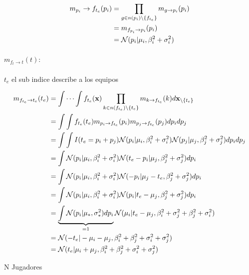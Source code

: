 \documentclass[11pt,twoside,spanish]{report} %
\begin{document}
\begin{equation}
	\centering
	\begin{split}
		m_{p_i}\rightarrow f_{t_e}(p_i) & = \prod_{g\in n(p_i)\backslash\{f_{t_e}\}} m_{g\rightarrow p_i}(p_i) \\
		& = m_{f_{p_i}\rightarrow p_i}(p_i) \\
		& =  \mathcal{N}(p_i \vert \mu_i,\beta_i^2+\sigma_i^2)
	\end{split}
\end{equation}

\paragraph{$m_{f_{t}\rightarrow t}(t):$} $t_e$ el sub indice describe a los equipos

\begin{equation}
	\centering
	\begin{split}
		m_{f_{t_e}\rightarrow t_e}(t_e) & = \int\cdots\int f_{t_e}(\textbf{x})\prod_{k\in n(f_{t_e})\backslash\{t_e\}} m_{k\rightarrow f_{t_e}}(k)d\textbf{x}_{\backslash \{t_e\}} \\
		& = \int\int f_{t_e}(t_e) m_{p_i\rightarrow f_{t_e}}(p_i)m_{p_j\rightarrow f_{t_e}}(p_j)dp_idp_j \\
		& = \int\int I(t_e=p_i+p_j)\mathcal{N}(p_i \vert \mu_i,\beta_i^2+\sigma_i^2)\mathcal{N}(p_j \vert \mu_j,\beta_j^2+\sigma_j^2)dp_idp_j\\
		& = \int \mathcal{N}(p_i \vert \mu_i,\beta_i^2+\sigma_i^2)\mathcal{N}(t_e-p_i \vert \mu_j,\beta_j^2+\sigma_j^2)dp_i\\
		& = \int \mathcal{N}(p_i \vert \mu_i,\beta_i^2+\sigma_i^2)\mathcal{N}(-p_i \vert \mu_j-t_e,\beta_j^2+\sigma_j^2)dp_i\\
		& = \int \mathcal{N}(p_i \vert \mu_i,\beta_i^2+\sigma_i^2)\mathcal{N}(p_i \vert t_e-\mu_j,\beta_j^2+\sigma_j^2)dp_i\\
		& = \underbrace{\int \mathcal{N}(p_i \vert \mu_{\ast},\sigma_{\ast}^2)dp_i}_{=1}\mathcal{N}(\mu_i \vert t_e-\mu_j,\beta_i^2+\sigma_j^2+\beta_j^2+\sigma_i^2)\\
		& =\mathcal{N}(-t_e \vert -\mu_i-\mu_j,\beta_i^2+\beta_j^2+\sigma_i^2+\sigma_j^2)\\
		& =\mathcal{N}(t_e \vert \mu_i+\mu_j,\beta_i^2+\beta_j^2+\sigma_i^2+\sigma_j	^2)\\
	\end{split}
\end{equation}

N Jugadores
\end{document}
